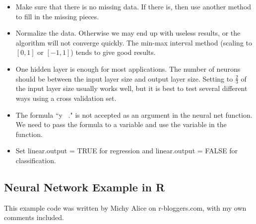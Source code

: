 \documentclass{article}
\begin{document}
\begin{itemize}
\item Make sure that there is no missing data. If there is, then use another method to fill in the missing pieces.
\item Normalize the data. Otherwise we may end up with useless results, or the algorithm will not converge quickly. The min-max interval method (scaling to $[0,1]$ or $[-1,1]$) tends to give good results.
\item One hidden layer is enough for most applications. The number of neurons should be between the input layer size and output layer size. Setting to $\frac{2}{3}$ of the input layer size usually works well, but it is best to test several different ways using a cross validation set.
\item The formula ``y ~." is not accepted as an argument in the neural net function. We need to pass the formula to a variable and use the variable in the function.
\item Set linear.output = TRUE for regression and linear.output = FALSE for classification.
\end{itemize}


\subsection{Neural Network Example in \textbf{R}}

This example code was written by Michy Alice on r-bloggers.com, with my own comments included.
\end{document}
